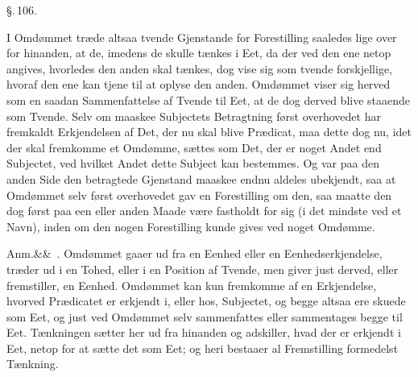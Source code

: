 \documentclass[12pt]{book}
\def\sperr#1{#1}%
\def\textit#1{#1}%
\def\emph#1{#1}%
\newcommand{\sperr}[1]{\textls[180]{#1}}
\newcommand{\parag}[1]{%
  \par\vspace{0.9\baselineskip}%
  {\centering\textit{\S.\,#1.}\par}%
  \vspace{0.35\baselineskip}%
  \noindent\hspace{\parindent}\ignorespaces
}
\newcommand{\anm}[1]{%
  \par\vspace{0.5\baselineskip}%
  \noindent\hspace{\parindent}\sperr{Anm.}\ifx&#1&\else~\textit{#1}.\fi
  \enspace\ignorespaces
}
\newcommand{\opage}[1]{\marginnote{\footnotesize\textit{[#1]}}}
\begin{document}
\parag{106}
I Omdømmet træde altsaa tvende Gjenstande for Forestilling saaledes lige over
for hinanden, at de, imedens de skulle tænkes i \emph{Eet}, da der ved den ene
netop angives, hvorledes den anden skal tænkes, dog vise sig som tvende
forskjellige, hvoraf den ene kan tjene til at oplyse den anden. Omdømmet viser
sig herved som en saadan \emph{Sammenfattelse af Tvende til Eet}, at de dog
derved blive staaende som \emph{Tvende}. Selv om maaskee Subjectets Betragtning
først overhovedet har fremkaldt Erkjendelsen af Det, der nu skal blive Prædicat,
maa dette dog nu, idet der skal fremkomme et Omdømme, sættes som Det, der er
noget Andet end Subjectet, ved hvilket Andet dette Subject kan bestemmes. Og var
paa den anden Side den betragtede Gjenstand maaskee endnu aldeles ubekjendt, saa
at Omdømmet selv først overhovedet gav en Forestilling om den, saa maatte den
dog først paa een eller anden Maade være fastholdt for sig (i det mindste ved et
Navn), inden om den nogen Forestilling kunde gives ved noget Omdømme.

\anm{} Omdømmet gaaer ud fra en Eenhed eller en Eenhedserkjendelse, træder ud i
en Tohed, eller i en Position af \emph{Tvende}, men giver
\opage{257} just derved, eller fremstiller, en Eenhed. Omdømmet kan kun fremkomme af en
Erkjendelse, hvorved Prædicatet er erkjendt i, eller hos, Subjectet, og begge
altsaa ere skuede som Eet, og just ved Omdømmet selv sammenfattes eller
sammentages begge til Eet. Tænkningen sætter her ud fra hinanden og adskiller,
hvad der er erkjendt i Eet, netop for at sætte det som Eet; og heri bestaaer al
Fremstilling formedelst Tænkning.
\end{document}
